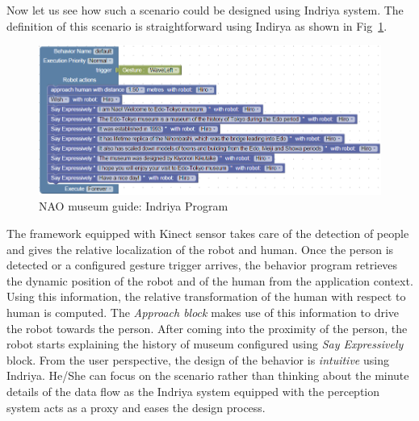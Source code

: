 Now let us see how such a scenario could be designed using Indriya system. The definition of this scenario is straightforward using Indirya as shown in Fig~\ref{fig:scenario1_program}.
\begin{figure}[H]
\centering
\includegraphics[width=\textwidth]{../thesis/assets/scenario1_new.png}
\caption[NAO museum guide: Indriya Program]{NAO museum guide: Indriya Program}
\label{fig:scenario1_program}
\end{figure}
The framework equipped with Kinect sensor takes care of the detection of people and gives the relative localization of the robot and human. Once the person is detected or a configured gesture trigger arrives, the behavior program retrieves the dynamic position of the robot and of the human from the application context. Using this information, the relative transformation of the human with respect to human is computed. The \emph{Approach block} makes use of this information to drive the robot towards the person. After coming into the proximity of the person, the robot starts explaining the history of museum configured using \emph{Say Expressively} block. From the user perspective, the design of the behavior is \emph{intuitive} using Indriya. He/She can focus on the scenario rather than thinking about the minute details of the data flow as the Indriya system equipped with the perception system acts as a proxy and eases the design process. 
